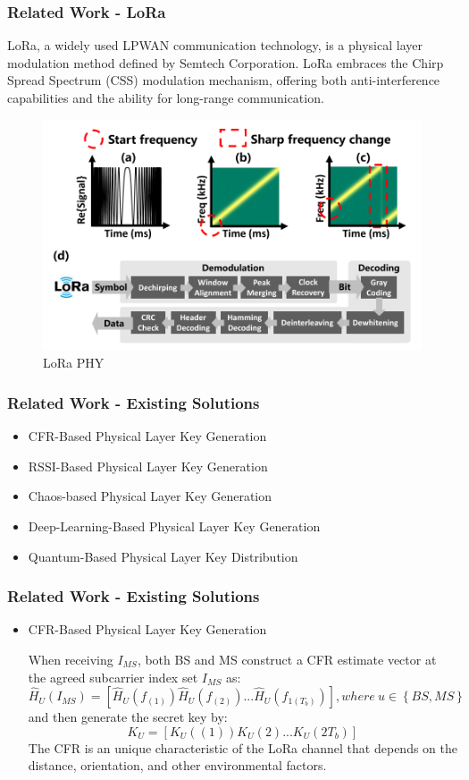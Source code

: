 \documentclass{beamer}
\begin{document}
\begin{frame}
  \frametitle{Related Work - LoRa}
  LoRa, a widely used LPWAN communication technology, is a physical layer modulation method defined by Semtech Corporation.
  LoRa embraces the Chirp Spread Spectrum (CSS) modulation mechanism, offering both anti-interference capabilities and the ability for long-range communication.
  \begin{figure}
    \centering
    \includegraphics[width=0.6\linewidth]{../figures/fig2-2.png}
    \caption{LoRa PHY\cite{10.1145/3546869}}
    \label{fig:2-2}
  \end{figure}
  
\end{frame}
\begin{frame}
  \frametitle{Related Work - Existing Solutions}
  \begin{itemize}
    \item CFR-Based Physical Layer Key Generation
    \item RSSI-Based Physical Layer Key Generation
    \item Chaos-based Physical Layer Key Generation
    \item Deep-Learning-Based Physical Layer Key Generation
    \item Quantum-Based Physical Layer Key Distribution
\end{itemize}
\end{frame}


\begin{frame}
  \frametitle{Related Work - Existing Solutions}
  \begin{itemize}
    \item CFR-Based Physical Layer Key Generation\cite{7054386}\cite{10158732}
    
    When receiving \(I_{MS}\), both BS and MS construct a CFR estimate vector at the agreed subcarrier index set \(I_{MS}\) as:
\begin{equation} 
  \hat{H}_{U}(I_{MS})   = \left [ \hat{H}_{U}(f_{(1)})\hat{H}_{U}(f_{(2)}) ...\hat{H}_{U}(f_{1(T_{b})}) \right ], where\ u\in \left \{ BS, MS  \right \}   
\end{equation} 
and then generate the secret key by:
\begin{equation} 
  K_{U}  = \left [ K_{U}({(1)})K_{U}{(2)} ...K_{U}({2T_{b}}) \right ]
\end{equation} 
The CFR is an unique characteristic of the LoRa channel that depends on the distance, orientation, and other environmental factors.

\end{itemize}
\end{frame}
\end{document}
